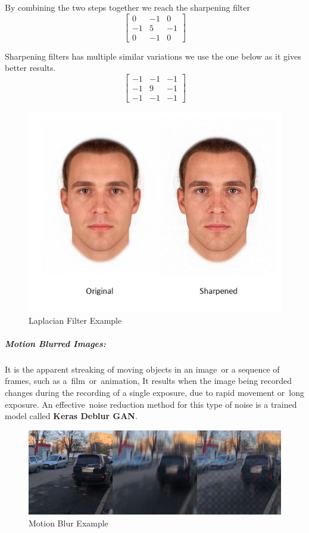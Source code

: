 By combining the two steps together we reach the sharpening filter
\[
\begin{bmatrix}
0 & -1 & 0 \\
-1 & 5 & -1 \\
0 & -1 & 0
\end{bmatrix} \]

Sharpening filters has multiple similar variations we use the one below as it gives better results.
\[
\begin{bmatrix}
-1 & -1 & -1 \\
-1 & 9 & -1 \\
-1 & -1 & -1
\end{bmatrix} \]

\begin{figure}[H]
	\centering
	\includegraphics[width=0.5\linewidth]{images/Sharpened.jpg}
	\caption{Laplacian Filter Example}
	\label{figure:laplacian}
\end{figure}

\subparagraph{Motion Blurred Images:}
It is the apparent streaking of moving objects in an image or a sequence of frames, such as a film or animation, It results when the image being recorded changes during the recording of a single exposure, due to rapid movement or long exposure.\newline
An effective noise reduction method for this type of noise is a trained model called \textbf{Keras Deblur GAN}.\newline
\begin{figure}[H]
	\centering
	\includegraphics[width=0.7\linewidth]{images/motion_blur.png}
	\caption{Motion Blur Example}
\end{figure}

